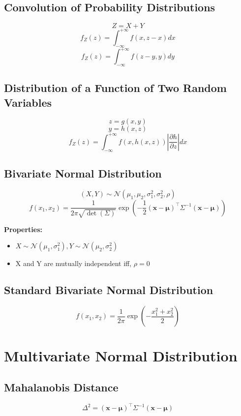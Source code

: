 \documentclass{article}
\begin{document}
\subsection{Convolution of Probability Distributions}
\[
    Z = X + Y
\]
\[
    f_Z(z) = \int_{-\infty}^{+\infty} f(x,z-x)dx
\]
\[
    f_Z(z) = \int_{-\infty}^{+\infty} f(z-y,y)dy
\]

\subsection{Distribution of a Function of Two Random Variables}
\[
    z=g(x,y)
\]
\[
    y=h(x,z)
\]
\[
    f_Z(z) = \int_{-\infty}^{+\infty} f(x,h(x,z)) \left| \frac{\partial h}{\partial z} \right| dx
\]

\subsection{Bivariate Normal Distribution}
\[ (X,Y) \sim \mathcal{N}(\mu_1, \mu_2, \sigma_1^2, \sigma_2^2, \rho) \]
\[
    f(x_1, x_2) = \frac{1}{2\pi\sqrt{\det(\Sigma)}} \exp\left(-\frac{1}{2}(\mathbf{x} - \boldsymbol{\mu})^\top \Sigma^{-1} (\mathbf{x} - \boldsymbol{\mu})\right)
\]

\textbf{Properties:}
\begin{itemize}
    \item \( X \sim \mathcal{N}(\mu_1, \sigma_1^2), Y \sim \mathcal{N}(\mu_2, \sigma_2^2) \)
    \item X and Y are mutually independent iff, \( \rho = 0 \)
\end{itemize}

\subsection{Standard Bivariate Normal Distribution}
\[
    f(x_1, x_2) = \frac{1}{2\pi} \exp\left(-\frac{x_1^2 + x_2^2}{2}\right)
\]

\newpage
\section{Multivariate Normal Distribution}

\subsection{Mahalanobis Distance}
\[
    \Delta^2 = (\mathbf{x} - \boldsymbol{\mu})^\top \Sigma^{-1} (\mathbf{x} - \boldsymbol{\mu})
\]
\end{document}
